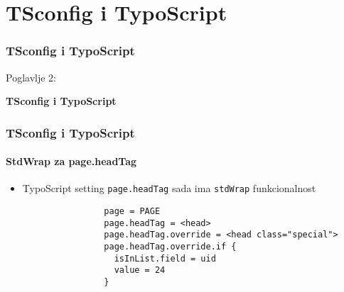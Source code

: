 %

\section{TSconfig i TypoScript}
\begin{frame}[fragile]
	\frametitle{TSconfig i TypoScript}

	\begin{center}\huge{Poglavlje 2:}\end{center}
	\begin{center}\huge{\color{typo3darkgrey}\textbf{TSconfig i TypoScript}}\end{center}

\end{frame}


\begin{frame}[fragile]
	\frametitle{TSconfig i TypoScript}
	\framesubtitle{StdWrap za page.headTag}

	\begin{itemize}
		\item TypoScript setting \texttt{page.headTag} sada ima \texttt{stdWrap} funkcionalnost

			\begin{lstlisting}
				page = PAGE
				page.headTag = <head>
				page.headTag.override = <head class="special">
				page.headTag.override.if {
		  		  isInList.field = uid
		  		  value = 24
				}
			\end{lstlisting}	

	\end{itemize}

\end{frame}

